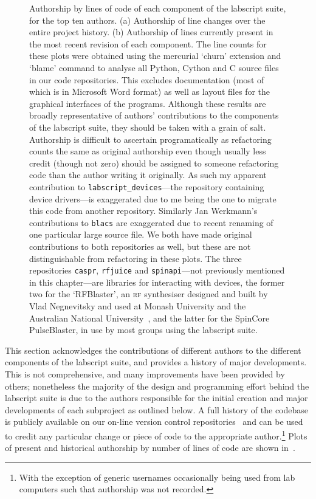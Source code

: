 \begin{figure}
    \caption{Authorship by lines of code of each component of the labscript suite, for the top ten authors. (a) Authorship of line changes over the entire project history. (b) Authorship of lines currently present in the most recent revision of each component. The line counts for these plots were obtained using the mercurial `churn' extension and `blame' command to analyse all Python, Cython and C source files in our code repositories. This excludes documentation (most of which is in Microsoft Word format) as well as layout files for the graphical interfaces of the programs. Although these results are broadly representative of authors' contributions to the components of the labscript suite, they should be taken with a grain of salt. Authorship is difficult to ascertain programatically as refactoring counts the same as original authorship even though usually less credit (though not zero) should be assigned to someone refactoring code than the author writing it originally. As such my apparent contribution to \texttt{labscript\_devices}---the repository containing device drivers---is exaggerated due to me being the one to migrate this code from another repository. Similarly Jan Werkmann's contributions to \texttt{blacs} are exaggerated due to recent renaming of one particular large source file. We both have made original contributions to both repositories as well, but these are not distinguishable from refactoring in these plots. The three repositories \texttt{caspr}, \texttt{rfjuice} and \texttt{spinapi}---not previously mentioned in this chapter---are libraries for interacting with devices, the former two for the `RFBlaster', an \textsc{rf} synthesiser designed and built by Vlad Negnevitsky and used at Monash University and the Australian National University~\cite{altin_precision_2013}, and the latter for the SpinCore PulseBlaster, in use by most groups using the labscript suite.}\label{fig:line_counts}
\end{figure}

This section acknowledges the contributions of different authors to the different components of the labscript suite, and provides a history of major developments. This is not comprehensive, and many improvements have been provided by others; nonetheless the majority of the design and programming effort behind the labscript suite is due to the authors responsible for the initial creation and major developments of each subproject as outlined below. A full history of the codebase is publicly available on our on-line version control repositories~\cite{monash_univeristy_labscript_2018, starkey_qtutils_2018, billington_zprocess_2018} and can be used to credit any particular change or piece of code to the appropriate author.\footnote{With the exception of generic usernames occasionally being used from lab computers such that authorship was not recorded.} Plots of present and historical authorship by number of lines of code are shown in~.

